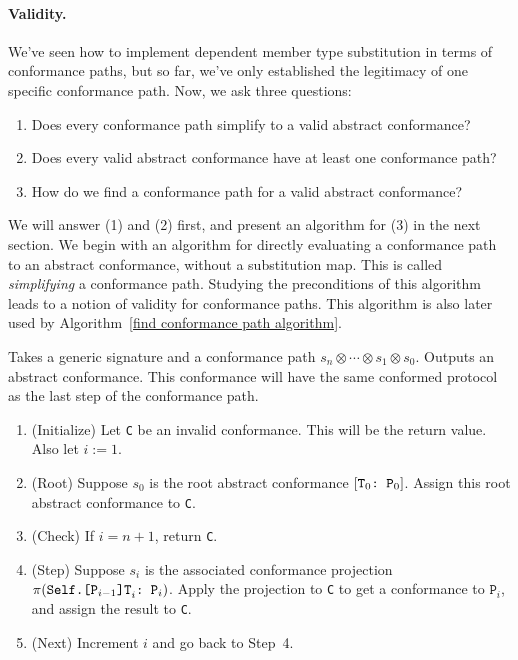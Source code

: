 \documentclass[../generics]{subfiles}
\begin{document}
\paragraph{Validity.} We've seen how to implement dependent member type substitution in terms of conformance paths, but so far, we've only established the legitimacy of one specific conformance path. Now, we ask three questions:
\begin{enumerate}
\item Does every conformance path simplify to a valid abstract conformance?
\item Does every valid abstract conformance have at least one conformance path?
\item How do we find a conformance path for a valid abstract conformance?
\end{enumerate}
We will answer (1) and (2) first, and present an algorithm for (3) in the next section. We begin with an algorithm for directly evaluating a conformance path to an abstract conformance, without a substitution map. This is called \emph{simplifying} a conformance path. Studying the preconditions of this algorithm leads to a notion of validity for conformance paths. This algorithm is also later used by Algorithm~\ref{find conformance path algorithm}.
\begin{algorithm}\label{invertconformancepath}
Takes a generic signature and a conformance path $s_n\otimes\cdots\otimes s_1\otimes s_0$. Outputs an abstract conformance. This conformance will have the same conformed protocol as the last step of the conformance path.
\begin{enumerate}
\item (Initialize) Let \texttt{C} be an invalid conformance. This will be the return value. Also let $i := 1$.
\item (Root) Suppose $s_0$ is the root abstract conformance $[\texttt{$\texttt{T}_0$:~$\texttt{P}_0$}]$. Assign this root abstract conformance to \texttt{C}.
\item (Check) If $i=n+1$, return \texttt{C}.
\item (Step) Suppose $s_i$ is the associated conformance projection $\pi(\texttt{$\texttt{Self.[$\texttt{P}_{i-1}$]T}_i$:~$\texttt{P}_i$})$. Apply the projection to \texttt{C} to get a conformance to $\texttt{P}_i$, and assign the result to \texttt{C}.
\item (Next) Increment $i$ and go back to Step~4.
\end{enumerate}
\end{algorithm}
\end{document}

